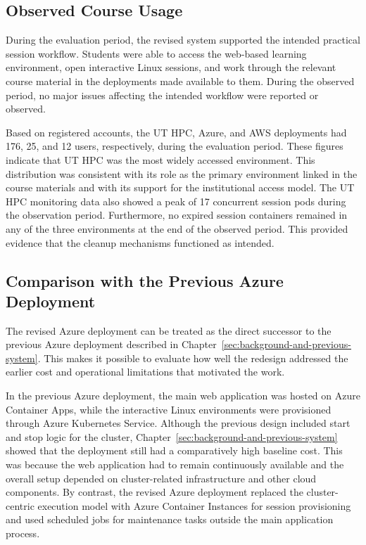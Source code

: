 \subsection{Observed Course Usage} \label{subsec:results-of-course-use}
During the evaluation period, the revised system supported the intended practical session workflow.
Students were able to access the web-based learning environment, open interactive Linux sessions, and work through the relevant course material in the deployments made available to them.
During the observed period, no major issues affecting the intended workflow were reported or observed.

Based on registered accounts, the UT HPC, Azure, and AWS deployments had 176, 25, and 12 users, respectively, during the evaluation period.
These figures indicate that UT HPC was the most widely accessed environment.
This distribution was consistent with its role as the primary environment linked in the course materials and with its support for the institutional access model.
The UT HPC monitoring data also showed a peak of 17 concurrent session pods during the observation period.
Furthermore, no expired session containers remained in any of the three environments at the end of the observed period.
This provided evidence that the cleanup mechanisms functioned as intended.

\subsection{Comparison with the Previous Azure Deployment} \label{subsec:comparison-with-the-previous-azure-deployment}
The revised Azure deployment can be treated as the direct successor to the previous Azure deployment described in Chapter~\ref{sec:background-and-previous-system}.
This makes it possible to evaluate how well the redesign addressed the earlier cost and operational limitations that motivated the work.

In the previous Azure deployment, the main web application was hosted on Azure Container Apps, while the interactive Linux environments were provisioned through Azure Kubernetes Service.
Although the previous design included start and stop logic for the cluster, Chapter~\ref{sec:background-and-previous-system} showed that the deployment still had a comparatively high baseline cost.
This was because the web application had to remain continuously available and the overall setup depended on cluster-related infrastructure and other cloud components.
By contrast, the revised Azure deployment replaced the cluster-centric execution model with Azure Container Instances for session provisioning and used scheduled jobs for maintenance tasks outside the main application process.

